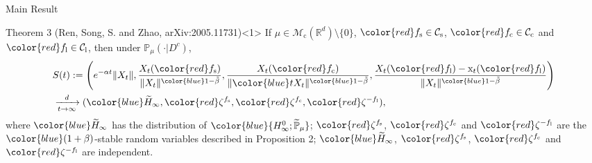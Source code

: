 \documentclass[xcolor=dvipsnames]{beamer}
\begin{document}
\begin{frame}{Main Result}
\begin{block}{Theorem 3 (Ren, Song, S. and Zhao, arXiv:2005.11731)}<1>
If $\mu\in \mathcal M_\mathrm c(\mathbb R^d)\setminus\{0\}$, $\color{red}f_\mathrm s\in \mathcal C_\mathrm s$, $\color{red}f_\mathrm c\in \mathcal C_\mathrm c$ and $\color{red}f_\mathrm l \in \mathcal C_\mathrm l$, then under $\mathbb P_\mu(\cdot | D^c)$,
	\begin{align*} 
	&S(t):=
	\Bigg(e^{-\alpha t}\|X_t\|, \frac{X_t({\color{red}f_\mathrm s})}{\|X_t\|^{{\color{blue}1-\tilde \beta}}},\frac{X_t({\color{red}f_\mathrm c)}}{\|{\color{blue}t}X_t\|^{{\color{blue}1-\tilde \beta}}}, \frac{ X_t({\color{red}f_\mathrm l}) - \mathrm x_t({\color{red}f_\mathrm l})}{\|X_t\|^{{\color{blue}1-\tilde \beta}}} \Bigg)
	\\&\xrightarrow[t\rightarrow \infty]{d}({\color{blue}\widetilde H_\infty},{\color{red}\zeta^{f_\mathrm s}},{\color{red}\zeta^{f_\mathrm c}},{\color{red}\zeta^{-f_\mathrm l}}),
	\end{align*}
	where 
${\color{blue}\widetilde H_\infty}$ has the distribution of $\color{blue}\{H^0_{\infty}; \widetilde {\mathbb P}_\mu\}$; $\color{red}\zeta^{f_\mathrm s}$, $\color{red}\zeta^{f_\mathrm c}$ and $\color{red}\zeta^{-f_\mathrm l}$ are the $\color{blue}(1+\beta)$-{\color{PineGreen}stable random variables} described in Proposition 2; $\color{blue}\widetilde H_\infty$,  $\color{red}\zeta^{f_\mathrm s}$, $\color{red}\zeta^{f_\mathrm c}$ and $\color{red}\zeta^{-f_\mathrm l}$ are independent.
\end{block}
\end{frame}
\end{document}
